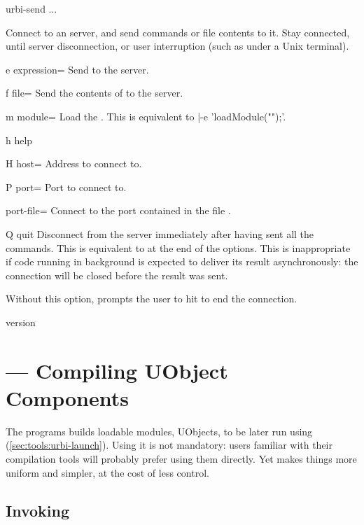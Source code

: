 \begin{shell}
urbi-send ...
\end{shell}

Connect to an \urbi server, and send commands or file contents to it.
Stay connected, until server disconnection, or user interruption (such
as  under a Unix terminal).

\begin{options}
\item[e]{expression=} Send  to the server.
\item[f]{file=} Send the contents of  to the
  server.
\item[m]{module=} Load the \UObject {}.  This is
  equivalent to \samp[style=varInString]|{-e 'loadModule("");'}.
\item[h]{help} \optionHelp
\item[H]{host=} Address to connect to.
\item[P]{port=} Port to connect to.
\item{port-file=} Connect to the port contained in the file
  .
\item[Q]{quit} Disconnect from the server immediately after having sent all
  the commands.  This is equivalent to  at the end of the
  options.  This is inappropriate if code running in background is expected
  to deliver its result asynchronously: the connection will be closed before
  the result was sent.

  Without this option,  prompts the user to hit
   to end the connection.
\item{version} \optionVersion
\end{options}


\section{ --- Compiling UObject Components}
\label{sec:tools:umake}

The  programs builds loadable modules, UObjects, to be
later run using 
(\autoref{sec:tools:urbi-launch}).  Using it is not mandatory: users
familiar with their compilation tools will probably prefer using them
directly.  Yet  makes things more uniform and simpler,
at the cost of less control.

\subsection{Invoking }
\label{sec:tools:umake:invoke}

